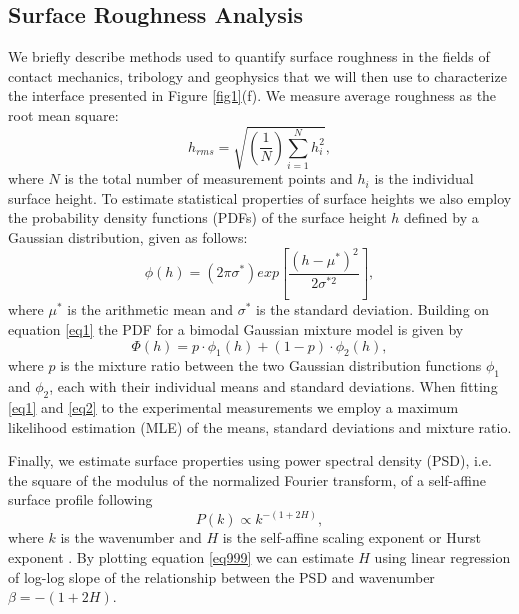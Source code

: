 \documentclass[preprint,1p, 10pt,authoryear]{elsarticle}
\begin{document}
\subsection{Surface Roughness Analysis}
\label{SRA}
We briefly describe methods used to quantify surface roughness in the fields of contact mechanics, tribology and geophysics that we will then use to characterize the interface presented in Figure \ref{fig1}(f). We measure average roughness as the root mean square:
\begin{equation}
h_{rms} = \sqrt{\left(\frac{1}{N} \right) \sum^{N}_{i=1} h_{i}^{2}} ,
\label{eq99}
\end{equation}
\noindent where $N$ is the total number of measurement points and $h_{i}$ is the individual surface height. To estimate statistical properties of surface heights we also employ the probability density functions (PDFs) of the surface height $h$ defined by a Gaussian distribution, given as follows:
\begin{equation}
\phi(h) = \left( 2\pi \sigma^{*} \right) exp\left[ \frac{\left(h - \mu^{*}\right)^{2}} { 2\sigma^{*2}}  \right],
\label{eq1}
\end{equation} 
\noindent where $\mu^{*}$ is the arithmetic mean and $\sigma^{*}$ is the standard deviation. Building on equation \eqref{eq1} the PDF for a bimodal Gaussian mixture model is given by 
\begin{equation}
\Phi(h) = p\cdot \phi_{1}(h)+\left(1-p\right)\cdot \phi_{2}(h),
\label{eq2}
\end{equation}
\noindent where $p$ is the mixture ratio between the two Gaussian distribution functions $\phi_{1}$ and $\phi_{2}$, each with their individual means and standard deviations. When fitting \eqref{eq1} and \eqref{eq2} to the experimental measurements we employ a maximum likelihood estimation (MLE) of the means, standard deviations and mixture ratio. 

Finally, we estimate surface properties using power spectral density (PSD), i.e.  the square of the modulus of the normalized Fourier transform, of a self-affine surface profile following 
\begin{equation}
P(k) \propto k^{-(1+2H)},
\label{eq999}
\end{equation}
\noindent where $k$ is the wavenumber and $H$ is the self-affine scaling exponent or Hurst exponent \citep{Power1991, Schmittbuhl1995, Mai2002, Candela2009}. By plotting equation \eqref{eq999} we can estimate $H$ using linear regression of log-log slope of the relationship between the PSD and wavenumber $\beta =-(1+2H)$.  
\end{document}
